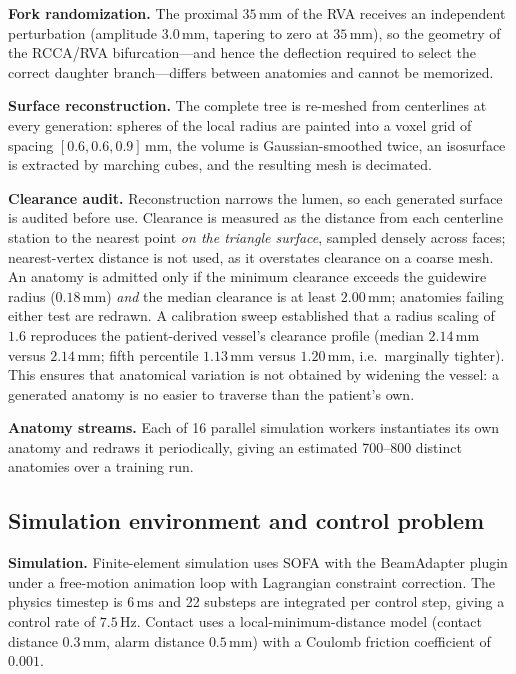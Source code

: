 \textbf{Fork randomization.} The proximal $35$\,mm of the RVA receives an independent
perturbation (amplitude $3.0$\,mm, tapering to zero at $35$\,mm), so the geometry of the
RCCA/RVA bifurcation---and hence the deflection required to select the correct daughter
branch---differs between anatomies and cannot be memorized.

\textbf{Surface reconstruction.} The complete tree is re-meshed from centerlines at every
generation: spheres of the local radius are painted into a voxel grid of spacing
$[0.6, 0.6, 0.9]$\,mm, the volume is Gaussian-smoothed twice, an isosurface is extracted by
marching cubes, and the resulting mesh is decimated.

\textbf{Clearance audit.} Reconstruction narrows the lumen, so each generated surface is
audited before use. Clearance is measured as the distance from each centerline station to the
nearest point \emph{on the triangle surface}, sampled densely across faces; nearest-vertex
distance is not used, as it overstates clearance on a coarse mesh. An anatomy is admitted only
if the minimum clearance exceeds the guidewire radius ($0.18$\,mm) \emph{and} the median
clearance is at least $2.00$\,mm; anatomies failing either test are redrawn. A calibration
sweep established that a radius scaling of $1.6$ reproduces the patient-derived vessel's
clearance profile (median $2.14$\,mm versus $2.14$\,mm; fifth percentile $1.13$\,mm versus
$1.20$\,mm, i.e.\ marginally tighter). This ensures that anatomical variation is not obtained
by widening the vessel: a generated anatomy is no easier to traverse than the patient's own.

\textbf{Anatomy streams.} Each of 16 parallel simulation workers instantiates its own anatomy
and redraws it periodically, giving an estimated 700--800 distinct anatomies over a training
run.

\subsection{Simulation environment and control problem}

\textbf{Simulation.} Finite-element simulation uses SOFA with the BeamAdapter plugin under a
free-motion animation loop with Lagrangian constraint correction. The physics timestep is
$6$\,ms and 22 substeps are integrated per control step, giving a control rate of $7.5$\,Hz.
Contact uses a local-minimum-distance model (contact distance $0.3$\,mm, alarm distance
$0.5$\,mm) with a Coulomb friction coefficient of $0.001$.


